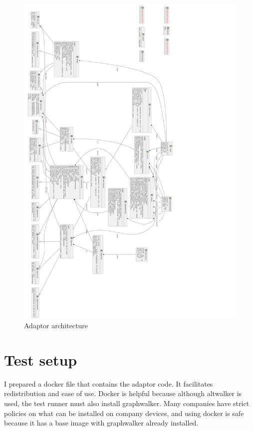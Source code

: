 \begin{figure}
    \centering
    \includegraphics[width=140mm, keepaspectratio]{figures/classes.png}
    \caption{Adaptor architecture}
    \label{fig:meth:arch}
\end{figure}

\section{Test setup}
\label{sec:meth:ts}

I prepared a docker file that contains the adaptor code. It facilitates redistribution and ease of use. Docker is helpful because although altwalker is used, the test runner must also install graphwalker. Many companies have strict policies on what can be installed on company devices, and using docker is safe because it has a base image with graphwalker already installed.

